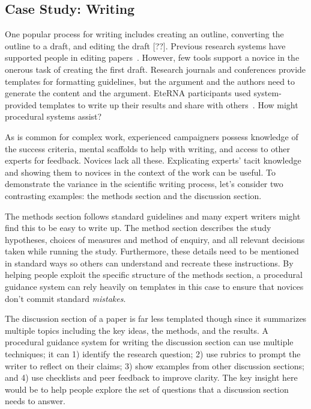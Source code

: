 \subsection{Case Study: Writing}
One popular process for writing includes creating an outline, converting the outline to a draft, and editing the draft [??]. Previous research systems have supported people in editing papers~\cite{Bernstein2010a}. However, few tools support a novice in the onerous task of creating the first draft. Research journals and conferences provide templates for formatting guidelines, but the argument and the authors need to generate the content and the argument. EteRNA participants used system-provided templates to write up their results and share with others~\cite{Lee2014}. How might procedural systems assist?

As is common for complex work, experienced campaigners possess knowledge of the success criteria, mental scaffolds to help with writing, and access to other experts for feedback. Novices lack all these. Explicating experts' tacit knowledge and showing them to novices in the context of the work can be useful. To demonstrate the variance in the scientific writing process, let’s consider two contrasting examples: the methods section and the discussion section.

The methods section follows standard guidelines and many expert writers might find this to be easy to write up. The method section describes the study hypotheses, choices of measures and method of enquiry, and all relevant decisions taken while running the study. Furthermore, these details need to be mentioned in standard ways so others can understand and recreate these instructions. By helping people exploit the specific structure of the methods section, a procedural guidance system can rely heavily on templates in this case to ensure that novices don't commit standard \textit{mistakes}. 

The discussion section of a paper is far less templated though since it summarizes multiple topics including the key ideas, the methods, and the results. A procedural guidance system for writing the discussion section can use multiple techniques; it can 1) identify the research question; 2) use rubrics to prompt the writer to reflect on their claims; 3) show examples from other discussion sections; and 4) use checklists and peer feedback to improve clarity. The key insight here would be to help people explore the set of questions that a discussion section needs to answer.

